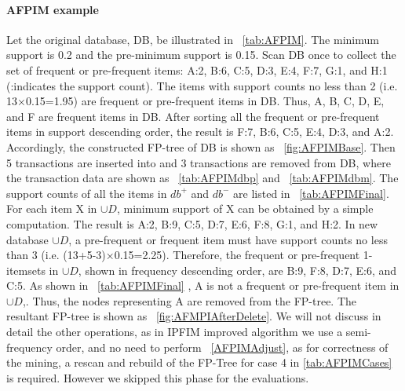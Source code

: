 \paragraph{AFPIM example}
\label{par:AFPIMexample}
Let the original database, DB, be illustrated in ~\ref{tab:AFPIM}. The minimum
support is 0.2 and the pre-minimum support is 0.15. Scan DB once to collect the set of
frequent or pre-frequent items: A:2, B:6, C:5, D:3, E:4, F:7, G:1, and H:1 (:indicates the
support count). The items with support counts no less than 2 (i.e. 13×0.15=1.95) are
frequent or pre-frequent items in DB. Thus, A, B, C, D, E, and F are frequent items in
DB. After sorting all the frequent or pre-frequent items in support descending order, the
result is F:7, B:6, C:5, E:4, D:3, and A:2. Accordingly, the constructed FP-tree of DB is
shown as ~\ref{fig:AFPIMBase}.
Then 5 transactions are inserted into and 3 transactions are removed from DB,
where the transaction data are shown as ~\ref{tab:AFPIMdbp} and ~\ref{tab:AFPIMdbm}. The support counts of all the items in $ db^+ $ and $ db^- $ are listed in ~\ref{tab:AFPIMFinal}. For each item X in $\cup D $,  minimum support of X can be obtained by a simple computation. The result is A:2, B:9, C:5, D:7, E:6, F:8, G:1, and H:2. In new database $\cup D $, a pre-frequent or frequent item must have support counts no less than 3 (i.e. (13+5-3)×0.15=2.25). Therefore, the frequent or pre-frequent 1-itemsets in $\cup D $, shown in frequency descending order, are B:9, F:8, D:7, E:6, and C:5.  As shown in ~\ref{tab:AFPIMFinal} , A is not a frequent or pre-frequent item in $\cup D $,.
Thus, the nodes representing A are removed from the FP-tree. The resultant FP-tree is shown as ~\ref{fig:AFMPIAfterDelete}. We will not discuss in detail the other operations, as in IPFIM improved algorithm we use a semi-frequency order, and no need to perform ~\ref{AFPIMAdjust}, as for correctness of the mining, a rescan and rebuild of the FP-Tree for case 4 in \ref{tab:AFPIMCases} is required.  However we skipped this phase for the evaluations.
  
